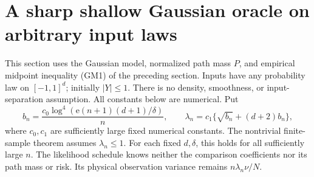 \section{A sharp shallow Gaussian oracle on arbitrary input laws}
\label{sec:general-shallow-sharp}
This section uses the Gaussian model, normalized path mass $P$, and
empirical midpoint inequality (GM1) of the preceding section. Inputs
have any probability law on $[-1,1]^d$; initially $|Y|\le1$.
There is no density, smoothness, or input-separation assumption.
All constants below are numerical. Put
\[
 b_n=\frac{c_0\log^4(\mathrm e(n+1)(d+1)/\delta)}n,
 \qquad \lambda_n=c_1\{\sqrt{b_n}+(d+2)b_n\},                 \tag{GS1}
\]
where $c_0,c_1$ are sufficiently large fixed numerical constants.
The nontrivial finite-sample theorem assumes $\lambda_n\le1$.
For each fixed $d,\delta$, this holds for all sufficiently large $n$.
The likelihood schedule knows neither the comparison coefficients nor
its path mass or risk. Its physical observation variance remains
$n\lambda_n\nu/N$.

